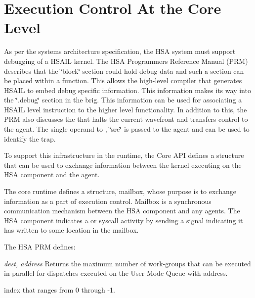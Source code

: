 %
%
%
%
%
%

\hypertarget{coreapi_coredebug}{}\section{Execution Control At the Core Level}\label{coreapi_coredebug}

As per the systems architecture specification, the H\-S\-A system must
support debugging of a H\-S\-A\-I\-L kernel. The H\-S\-A
Programmers Reference Manual (P\-R\-M) describes that the
\char`\"{}block\char`\"{} section could hold debug data and such a
section can be placed within a function. This allows the
high-\/level compiler that generates H\-S\-A\-I\-L to embed debug
specific information. This information makes its way into the
\char`\"{}.\-debug\char`\"{} section in the brig. This information
can be used for associating a H\-S\-A\-I\-L level instruction to the
higher level functionality. In addition to this, the P\-R\-M also
discusses the  that halts the current wavefront
and transfers control to the agent.  The single operand to
, \char`\"{}src\char`\"{} is passed to the
agent and can be used to identify the trap.

To support this infrastructure in the runtime, the Core A\-P\-I
defines a structure that can be used to exchange information between
the kernel executing on the H\-S\-A component and the agent.

The core runtime defines a structure, mailbox, whose purpose is to
exchange information as a part of execution control. Mailbox is a
synchronous communication mechanism between the H\-S\-A component
and any agents. The H\-S\-A component indicates a  or syscall activity by sending a signal indicating
it has written to some location in the mailbox.

The HSA PRM defines:

\begin{description}
\item {}  {\itshape dest, address}
Returns the maximum number of work-groups that can be executed in
parallel for dispatches executed on the User Mode Queue with
address.

\item {} index that ranges from 0 through
-1.
\end{description}

